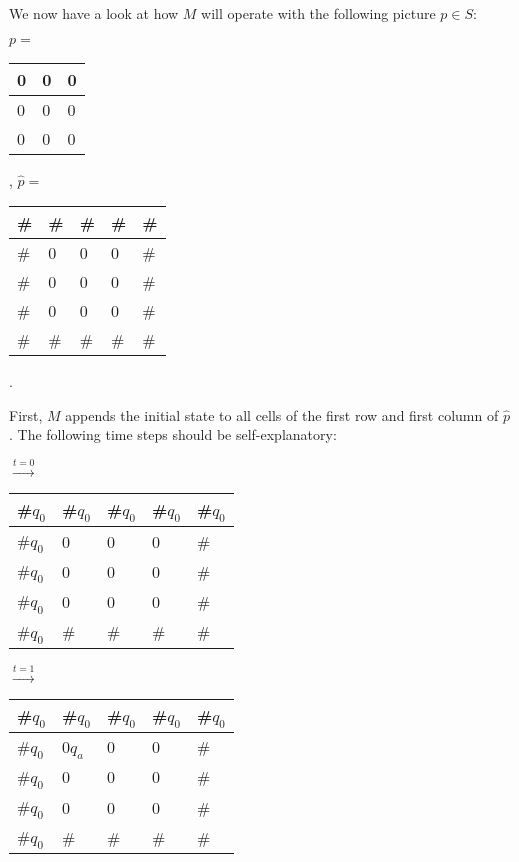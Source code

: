 We now have a look at how $M$ will operate with the following picture $p \in S$:
\begin{center}
$p = $\begin{tabular}{|C{0.6cm}|C{0.6cm}|C{0.6cm}|}
  & 0  & 0 \tabularnewline
{}  & 0  & 0 \tabularnewline
{}  & 0  & 0 \tabularnewline
\hline
\end{tabular}, 
$ \hat{p} = $\begin{tabular}{|C{0.77cm}|C{0.7cm}|C{0.7cm}|C{0.7cm}|C{0.7cm}|}
\hline
\# & \# & \# & \# & \# \tabularnewline
\hline
\# & 0  & 0  & 0  & \# \tabularnewline
\hline
\# & 0  & 0  & 0  & \# \tabularnewline
\hline
\# & 0  & 0  & 0  & \# \tabularnewline
\hline
\# & \# & \# & \# & \# \tabularnewline
\hline
\end{tabular}.
\end{center}
First, $M$ appends the initial state to all cells of the first row and first column of $\hat{p}$.
The following time steps should be self-explanatory:
\begin{center}
$\overset{t = 0}{\rightarrow}$
\begin{tabular}{|C{1.1cm}|C{1.1cm}|C{1.1cm}|C{1.1cm}|C{1.1cm}|}
\hline
\#$q_0$ & \#$q_0$ & \#$q_0$ & \#$q_0$ & \#$q_0$ \tabularnewline
\hline
\#$q_0$ & 0       & 0       & 0       & \#      \tabularnewline
\hline
\#$q_0$ & 0       & 0       & 0       & \#      \tabularnewline
\hline
\#$q_0$ & 0       & 0       & 0       & \#      \tabularnewline
\hline
\#$q_0$ & \#      & \#      & \#      & \#      \tabularnewline
\hline
\end{tabular}
$\overset{t = 1}{\rightarrow}$
\begin{tabular}{|C{1.1cm}|C{1.1cm}|C{1.1cm}|C{1.1cm}|C{1.1cm}|}
\hline
\#$q_0$ & \#$q_0$ & \#$q_0$ & \#$q_0$ & \#$q_0$ \tabularnewline
\hline
\#$q_0$ & 0$q_a$  & 0       & 0       & \#      \tabularnewline
\hline
\#$q_0$ & 0       & 0       & 0       & \#      \tabularnewline
\hline
\#$q_0$ & 0       & 0       & 0       & \#      \tabularnewline
\hline
\#$q_0$ & \#      & \#      & \#      & \#      \tabularnewline
\hline
\end{tabular}
\end{center}
